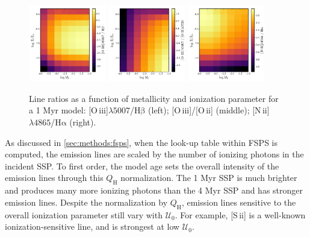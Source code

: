 \documentclass[twocolumn, tighten]{aastex61}
\newcommand{\Sec}[1]{\autoref{sec:#1}}
\newcommand{\FSPS}{{\sc FSPS}\xspace}
\newcommand{\nii}{[N\,{\sc ii}]\xspace}
\newcommand{\sii}{[S\,{\sc ii}]\xspace}
\newcommand{\oiii}{[O\,{\sc iii}]\xspace}
\newcommand{\oii}{[O\,{\sc ii}]\xspace}
\newcommand{\ha}{\ensuremath{\mathrm{H\alpha}}}
\newcommand{\hb}{\ensuremath{\mathrm{H\beta}}}
\newcommand\lam[1]{\ensuremath{\lambda #1}}
\newcommand{\QH}{\ensuremath{Q_{\mathrm{H}}}}
\newcommand{\U}{\ensuremath{\mathcal{U}_{0}}}
\newcommand\niiha{\nii{}\lam{4865}/\ha{}}
\newcommand\oiiihb{\oiii{}\lam{5007}/\hb{}}
\newcommand\oiiioii{\oiii{}/\oii{}}
\begin{document}
\begin{figure}[Ht!]
  \begin{centering}
    \includegraphics[width=0.3\textwidth]{f14a.pdf}
    \includegraphics[width=0.3\textwidth]{f14b.pdf}
    \includegraphics[width=0.3\textwidth]{f14c.pdf}
    \caption{Line ratios as a function of metallicity and ionization parameter for a 1 Myr model: \oiiihb{} (left); \oiiioii{} (middle); \niiha{} (right).}
    \label{fig:LineRatios}
  \end{centering}
\end{figure}

As discussed in \Sec{methods:fsps}, when the look-up table within \FSPS is computed, the emission lines are scaled by the number of ionizing photons in the incident SSP. To first order, the model age sets the overall intensity of the emission lines through this \QH{} normalization. The 1 Myr SSP is much brighter and produces many more ionizing photons than the 4 Myr SSP and has stronger emission lines. Despite the normalization by \QH{}, emission lines sensitive to the overall ionization parameter still vary with \U{}. For example, \sii{} is a well-known ionization-sensitive line, and is strongest at low \U{}.
\end{document}
